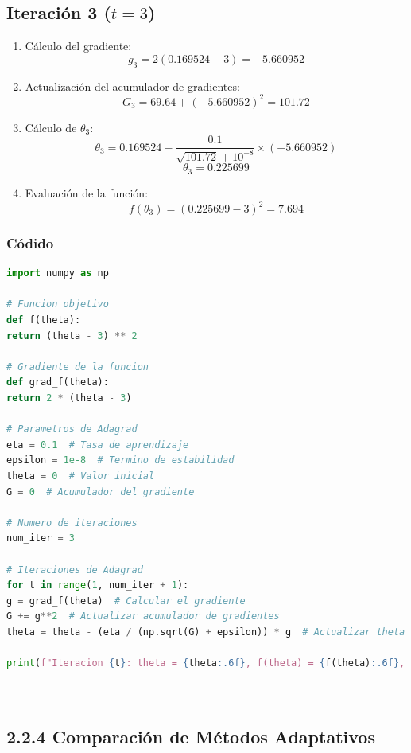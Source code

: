 \documentclass{article}
\begin{document}
\subsection*{Iteración 3 (\( t = 3 \))}

\begin{enumerate}
	\item Cálculo del gradiente:
	\[
	g_3 = 2(0.169524 - 3) = -5.660952
	\]
	\item Actualización del acumulador de gradientes:
	\[
	G_3 = 69.64 + (-5.660952)^2 = 101.72
	\]
	\item Cálculo de \( \theta_3 \):
	\[
	\theta_3 = 0.169524 - \frac{0.1}{\sqrt{101.72} + 10^{-8}} \times (-5.660952)
	\]
	\[
	\theta_3 = 0.225699
	\]
	\item Evaluación de la función:
	\[
	f(\theta_3) = (0.225699 - 3)^2 = 7.694
	\]
\end{enumerate}


\subsubsection*{Códido}
\begin{lstlisting}[language=Python, caption=Adaptive Gradient Algorithm, frame=single]
import numpy as np

# Funcion objetivo
def f(theta):
return (theta - 3) ** 2

# Gradiente de la funcion
def grad_f(theta):
return 2 * (theta - 3)

# Parametros de Adagrad
eta = 0.1  # Tasa de aprendizaje
epsilon = 1e-8  # Termino de estabilidad
theta = 0  # Valor inicial
G = 0  # Acumulador del gradiente

# Numero de iteraciones
num_iter = 3

# Iteraciones de Adagrad
for t in range(1, num_iter + 1):
g = grad_f(theta)  # Calcular el gradiente
G += g**2  # Actualizar acumulador de gradientes
theta = theta - (eta / (np.sqrt(G) + epsilon)) * g  # Actualizar theta

print(f"Iteracion {t}: theta = {theta:.6f}, f(theta) = {f(theta):.6f}, G = {G:.6f}")

	
\end{lstlisting}

\subsection*{2.2.4 Comparación de Métodos Adaptativos}
\end{document}
